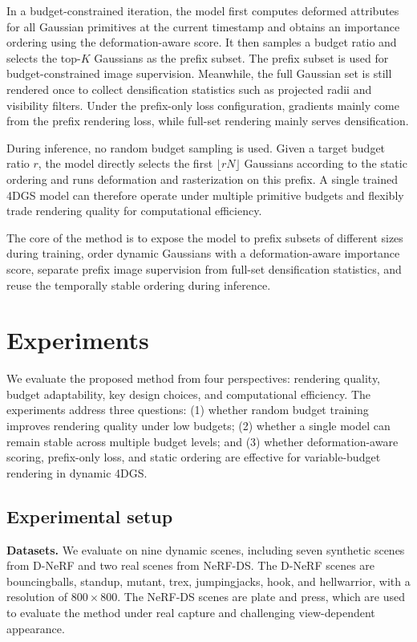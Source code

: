 \documentclass[pdflatex,sn-mathphys]{sn-jnl}
\begin{document}
In a budget-constrained iteration, the model first computes deformed attributes for all Gaussian primitives at the current timestamp and obtains an importance ordering using the deformation-aware score. It then samples a budget ratio and selects the top-$K$ Gaussians as the prefix subset. The prefix subset is used for budget-constrained image supervision. Meanwhile, the full Gaussian set is still rendered once to collect densification statistics such as projected radii and visibility filters. Under the prefix-only loss configuration, gradients mainly come from the prefix rendering loss, while full-set rendering mainly serves densification.

During inference, no random budget sampling is used. Given a target budget ratio $r$, the model directly selects the first $\lfloor rN \rfloor$ Gaussians according to the static ordering and runs deformation and rasterization on this prefix. A single trained 4DGS model can therefore operate under multiple primitive budgets and flexibly trade rendering quality for computational efficiency.

The core of the method is to expose the model to prefix subsets of different sizes during training, order dynamic Gaussians with a deformation-aware importance score, separate prefix image supervision from full-set densification statistics, and reuse the temporally stable ordering during inference.

\section{Experiments}
\label{sec:experiments}

We evaluate the proposed method from four perspectives: rendering quality, budget adaptability, key design choices, and computational efficiency. The experiments address three questions: (1) whether random budget training improves rendering quality under low budgets; (2) whether a single model can remain stable across multiple budget levels; and (3) whether deformation-aware scoring, prefix-only loss, and static ordering are effective for variable-budget rendering in dynamic 4DGS.

\subsection{Experimental setup}
\label{sec:setup}

\textbf{Datasets.} We evaluate on nine dynamic scenes, including seven synthetic scenes from D-NeRF and two real scenes from NeRF-DS. The D-NeRF scenes are bouncingballs, standup, mutant, trex, jumpingjacks, hook, and hellwarrior, with a resolution of $800\times800$. The NeRF-DS scenes are plate and press, which are used to evaluate the method under real capture and challenging view-dependent appearance.
\end{document}

